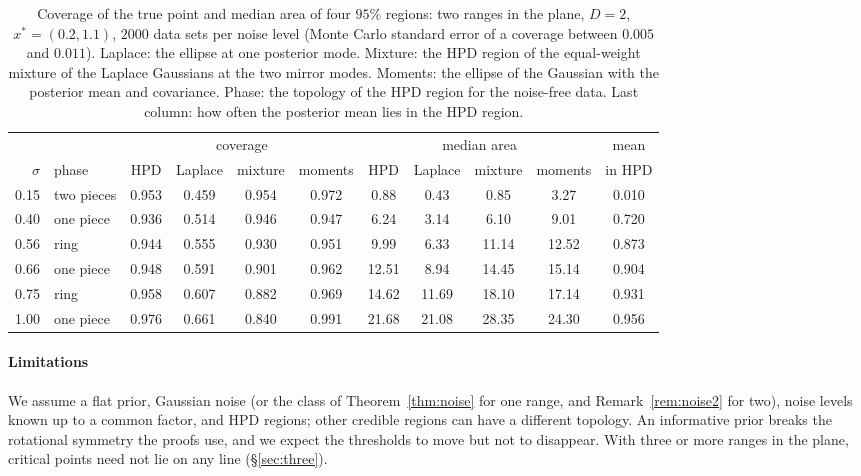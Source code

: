 \begin{table}[t]\centering\footnotesize
\caption{Coverage of the true point and median area of four $95\%$ regions: two ranges in the plane, $D = 2$,
$x^* = (0.2, 1.1)$, $2000$ data sets per noise level (Monte Carlo standard error of a coverage between $0.005$ and
$0.011$). Laplace: the ellipse at one posterior mode. Mixture: the HPD region of the equal-weight mixture of the Laplace
Gaussians at the two mirror modes. Moments: the ellipse of the Gaussian with the posterior mean and covariance. Phase:
the topology of the HPD region for the noise-free data. Last column: how often the posterior mean lies in the HPD
region.}
\label{tab:coverage}
\setlength{\tabcolsep}{3.2pt}
\begin{tabular}{rl@{\quad}cccc@{\quad}cccc@{\quad}c}\toprule
& & \multicolumn{4}{c}{coverage} & \multicolumn{4}{c}{median area} & mean\\
$\sigma$ & phase & HPD & Laplace & mixture & moments & HPD & Laplace & mixture & moments & in HPD\\\midrule
0.15 & two pieces & 0.953 & 0.459 & 0.954 & 0.972 & 0.88 & 0.43 & 0.85 & 3.27 & 0.010\\
0.40 & one piece & 0.936 & 0.514 & 0.946 & 0.947 & 6.24 & 3.14 & 6.10 & 9.01 & 0.720\\
0.56 & ring & 0.944 & 0.555 & 0.930 & 0.951 & 9.99 & 6.33 & 11.14 & 12.52 & 0.873\\
0.66 & one piece & 0.948 & 0.591 & 0.901 & 0.962 & 12.51 & 8.94 & 14.45 & 15.14 & 0.904\\
0.75 & ring & 0.958 & 0.607 & 0.882 & 0.969 & 14.62 & 11.69 & 18.10 & 17.14 & 0.931\\
1.00 & one piece & 0.976 & 0.661 & 0.840 & 0.991 & 21.68 & 21.08 & 28.35 & 24.30 & 0.956\\\bottomrule
\end{tabular}
\end{table}

\paragraph{Limitations} We assume a flat prior, Gaussian noise (or the class of Theorem~\ref{thm:noise} for one
range, and Remark~\ref{rem:noise2} for two), noise levels known up to a common factor, and HPD regions; other credible regions can have a different topology. An informative
prior breaks the rotational symmetry the proofs use, and we expect the thresholds to move but not to disappear. With
three or more ranges in the plane, critical points need not lie on any line (\S\ref{sec:three}).

